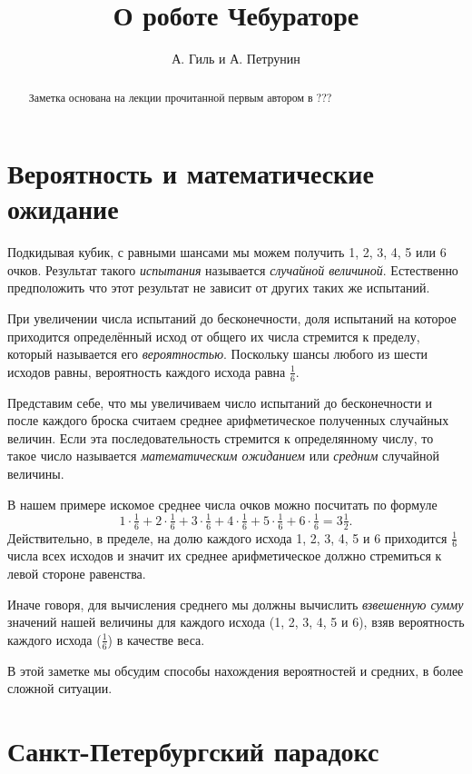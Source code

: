\documentclass{article}
\begin{document}
\title{О роботе Чебураторе}
\author{А. Гиль и А. Петрунин}
\date{}
\maketitle
\begin{abstract}
Заметка основана на лекции прочитанной первым автором в ??? 
\end{abstract}

\section{Вероятность и математические ожидание}

Подкидывая кубик,
с равными шансами мы можем получить 1, 2, 3, 4, 5 или 6 очков.
Результат такого \emph{испытания} называется \emph{случайной величиной}.
Естественно предположить что этот результат не зависит от других таких же испытаний.

При увеличении числа испытаний до бесконечности,
доля испытаний на которое приходится определённый исход 
от общего их числа 
стремится к пределу, 
который называется его \emph{вероятностью}.
Поскольку шансы любого из шести исходов равны,
вероятность каждого исхода равна $\tfrac16$.

Представим себе, что мы увеличиваем число испытаний до бесконечности
и после каждого броска считаем среднее арифметическое полученных случайных величин.
Если эта последовательность стремится к определянному числу,
то такое число называется \emph{математическим ожиданием} или \emph{средним} случайной величины.

В нашем примере искомое среднее числа очков можно посчитать по формуле
\[1\cdot\tfrac16+2\cdot\tfrac16+3\cdot\tfrac16+4\cdot\tfrac16+5\cdot\tfrac16+6\cdot\tfrac16=3\tfrac12.\]
Действительно, в пределе, 
на долю каждого исхода 1, 2, 3, 4, 5 и 6
приходится $\tfrac16$ числа всех исходов
и значит их среднее арифметическое должно 
стремиться к левой стороне равенства.

Иначе говоря, для вычисления среднего мы должны вычислить \emph{взвешенную сумму} значений нашей величины для каждого исхода
(1, 2, 3, 4, 5 и 6), 
взяв вероятность каждого исхода ($\tfrac16$)
в качестве веса.

В этой заметке мы обсудим способы нахождения 
вероятностей 
и средних, 
в более сложной ситуации.
 
\section{Санкт-Петербургский парадокс}
\end{document}
